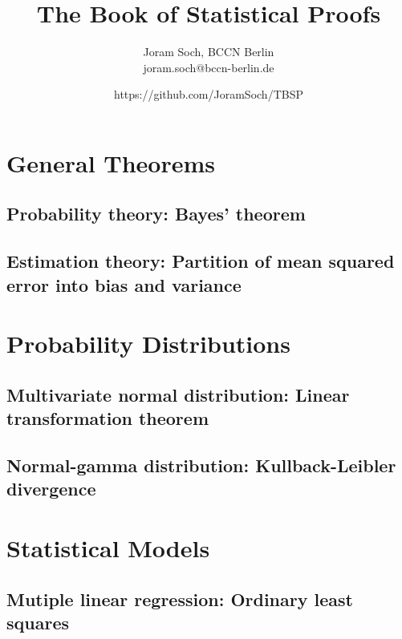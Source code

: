 \documentclass[a4paper,12pt]{book}
\title{The Book of Statistical Proofs}
\author{Joram Soch, BCCN Berlin \\ joram.soch@bccn-berlin.de}
\date{https://github.com/JoramSoch/TBSP}
\begin{document}
\maketitle

\pagebreak
{}
\tableofcontents

\newpage
{}


\chapter{General Theorems} \newpage

\section{Probability theory: Bayes' theorem}


\section{Estimation theory: Partition of mean squared error into bias and variance}



\chapter{Probability Distributions} \newpage

\section{Multivariate normal distribution: Linear transformation theorem}


\section{Normal-gamma distribution: Kullback-Leibler divergence}



\chapter{Statistical Models} \newpage

\section{Mutiple linear regression: Ordinary least squares}

\end{document}
